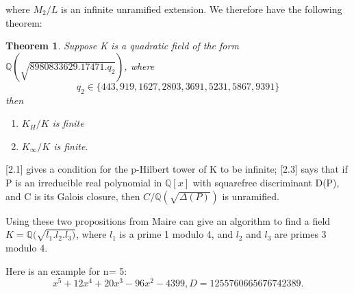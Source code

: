 \documentclass[preprint,12pt,reqno]{elsarticle}
\newtheorem{theorem}{Theorem}
\begin{document}
where $M_2/L$ is an infinite unramified extension. We therefore have the following theorem:
\begin{theorem}
    Suppose K is a quadratic field of the form $\mathbb{Q}(\sqrt{8980833629.17471.q_2})$, where 
    \begin{equation}
        q_2\in\{443,919,1627,2803,3691,5231,5867,9391\}
    \end{equation}
    then \begin{enumerate}
        \item $K_H/K$ is finite
        \item $K_\infty/K$ is finite.
    \end{enumerate}
\end{theorem}
\cite{MAIR}[2.1] gives a condition for the p-Hilbert tower of K to be infinite; \cite{MAIR}[2.3] says that if P is an irreducible real polynomial in $\mathbb{Q}[x]$ with squarefree discriminant D(P), and C is its Galois closure, then $C/\mathbb{Q}(\sqrt{\Delta(P)})$ is unramified.
\par
Using these two propositions from Maire can give an algorithm to find a field $K=\mathbb{Q}(\sqrt{l_1.l_2.l_3)}$, where $l_1$ is a prime 1 modulo 4, and $l_2$ and $l_3$ are primes 3 modulo 4. 
\par
Here is an example for n= 5:
\begin{equation}
    x^5 + 12x^4 + 20x^3 - 96x^2 - 4399, D=1255760665676742389.
\end{equation}
\end{document}
